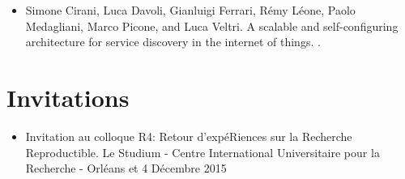 \begin{itemize}
  \item Simone Cirani, Luca Davoli, Gianluigi Ferrari, R{\'e}my L{\'e}one, Paolo
  Medagliani, Marco Picone, and Luca Veltri.
\newblock A scalable and self-configuring architecture for service discovery in
  the internet of things.
  .
\end{itemize}

\section*{Invitations}

\begin{itemize}
    \item Invitation au colloque R4: Retour d'expéRiences sur la Recherche Reproductible.
  \newblock Le Studium - Centre International Universitaire pour la Recherche - Orléans
   et 4 Décembre 2015 

\end{itemize}

\vspace*{8ex}
\newpage




        
    



       
\endgroup